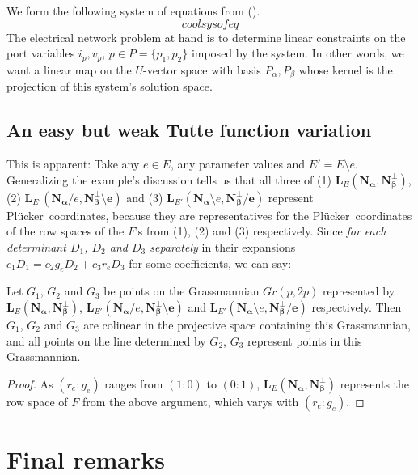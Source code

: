 \documentclass[Unicode]{cedram-alco}
\newcommand{\ext}[1]{\ensuremath{\mathbf{#1}}}
\newcommand{\Plucker}{Pl\"{u}cker\ }
\begin{document}
We form the following system of equations from ().
\[
cool sys of eq
\]
The electrical network problem at hand is to determine linear constraints on the
port variables $i_p, v_p$, $p\in P = \{p_1, p_2\}$ imposed by the system.  In other words,
we want a linear map on the $U$-vector space with basis $P_\alpha, P_\beta$ whose kernel
is the projection of this system's solution space.


\subsection{An easy but weak Tutte function variation}

This is apparent:  Take any $e\in E$, any parameter
values and $E'=E\setminus e$. Generalizing the example's discussion tells us that all three of
(1) $\ext{L}_E(\ext{N_\alpha},\ext{N_\beta^\perp})$,
(2) $\ext{L}_{E'}(\ext{N_\alpha}/e,\ext{N_\beta^\perp\setminus e})$ and
(3) $\ext{L}_{E'}(\ext{N_\alpha}\setminus e,\ext{N_\beta^\perp/e})$ represent
\Plucker coordinates, because they are representatives for the \Plucker coordinates
of the row spaces of the $F$'s from (1), (2) and (3) respectively.  Since \emph{for each determinant
$D_1$, $D_2$ and $D_3$ separately} in their expansions $c_1 D_1 = c_2 g_e D_2 + c_3 r_e D_3$ for
some coefficients, we can say:

\begin{prop}
Let $G_1$, $G_2$ and $G_3$ be points on the Grassmannian $Gr(p,2p)$ represented by
$\ext{L}_E(\ext{N_\alpha},\ext{N_\beta^\perp})$,
$\ext{L}_{E'}(\ext{N_\alpha}/e,\ext{N_\beta^\perp\setminus e})$ and
$\ext{L}_{E'}(\ext{N_\alpha}\setminus e,\ext{N_\beta^\perp/e})$ respectively. Then
$G_1$, $G_2$ and $G_3$ are colinear in the projective space containing this Grassmannian, and
all points on the line determined by $G_2$, $G_3$ represent points in this Grassmannian.
\end{prop}
\begin{proof}
  As $(r_e:g_e)$ ranges from $(1:0)$ to $(0:1)$, $\ext{L}_E(\ext{N_\alpha},\ext{N_\beta^\perp})$ represents
  the row space of $F$ from the above argument, which varys with $(r_e:g_e)$.
\end{proof}




\section{Final remarks}





\end{document}
